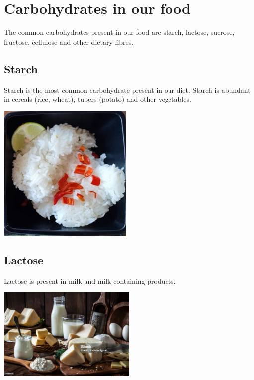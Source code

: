 \documentclass[
]{book}
\begin{document}
\section{Carbohydrates in our food}\label{carbohydrates-in-our-food}

The common carbohydrates present in our food are starch, lactose, sucrose, fructose, cellulose and other dietary fibres.

\subsection*{Starch}\label{starch}

Starch is the most common carbohydrate present in our diet. Starch is abundant in cereals (rice, wheat), tubers (potato) and other vegetables.

\includegraphics[width=\textwidth,height=2.60417in]{Images/Rice.jpg}

\subsection*{Lactose}\label{lactose}

Lactose is present in milk and milk containing products.

\includegraphics[width=0.5\textwidth,height=\textheight]{Images/Diary.jpg}
\end{document}
